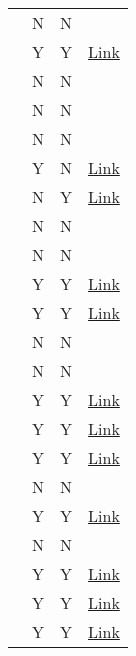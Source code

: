 \begin{table*}[htbp]
{\begin{tabular}{lccc}
        \citet{frantar_scaling_2023} & N & N & ~ \\ 
        \citet{krajewski_scaling_2024} & Y & Y & \href{https://github.com/llm-random/llm-random}{Link}  \\ 
        \citet{yun_toward_2024} & N & N & ~ \\ 
        \citet{chen2024scaling} & N & N & ~ \\ 
        \citet{henighan_scaling_2020} & N & N & ~ \\ 
        \citet{zhai_scaling_2022} & Y & N & \href{https://github.com/google-research/vision_transformer}{Link}  \\ 
        \citet{alabdulmohsin_revisiting_2022} & N & Y & \href{https://github.com/google-research/google-research/tree/master/revisiting_neural_scaling_laws}{Link}  \\ 
        \citet{aghajanyan_scaling_2023} & N & N & ~ \\ 
        \citet{li_are_2024} & N & N & ~ \\ 
        \citet{jones_scaling_2021} & Y & Y & \href{https://github.com/andyljones/boardlaw}{Link}  \\ 
        \citet{neumann_scaling_2023} & Y & Y & \href{https://github.com/OrenNeumann/AlphaZero-scaling-laws}{Link}  \\ 
        \citet{gao_scaling_2022} & N & N & ~ \\ 
        \citet{hilton_scaling_2023} & N & N & ~ \\ 
        \citet{ye_data_2024} & Y & Y & \href{https://github.com/yegcjs/mixinglaws}{Link}  \\ 
        \citet{liu_regmix:_2024} & Y & Y & \href{https://github.com/sail-sg/regmix}{Link}  \\ 
         \citet{kang_autoscale:_2024} & Y & Y & \href{https://github.com/feiyang-k/AutoScale }{Link} \\ 
        \citet{que_d-cpt_2024} & N & N & ~ \\ 
        \citet{tao_scaling_2024} & Y & Y & \href{https://github.com/sail-sg/scaling-with-vocab}{Link}  \\ 
        \citet{circuits_nodate} & N & N & ~ \\ 
        \citet{gao_scaling_2024} & Y & Y & \href{https://github.com/openai/sparse_autoencoder}{Link}  \\ 
        \citet{shao_scaling_2024} & Y & Y & \href{https://github.com/RulinShao/retrieval-scaling}{Link}  \\ 
        \citet{muennighoff_scaling_2023} & Y & Y & \href{https://github.com/huggingface/datablations}{Link}  \\ 

\end{tabular}}
\end{table*}
